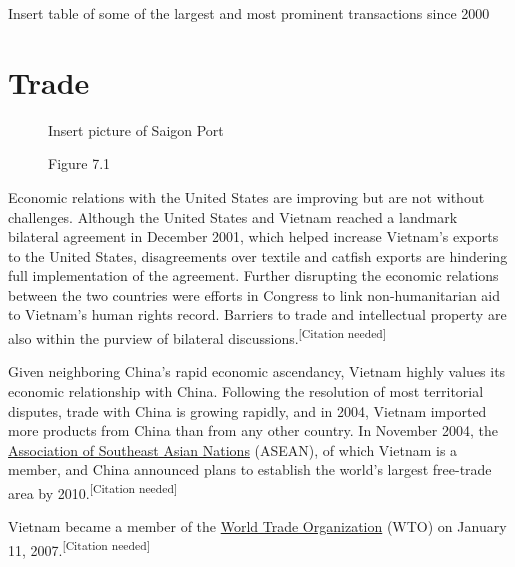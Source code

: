 \documentclass[openany]{book}
\begin{document}
\begin{table}[h]
    \centering
    Insert table of some of the largest and most prominent transactions since 2000
\end{table}

\chapter{Trade}

\begin{figure}
    \begin{framed}
    Insert picture of Saigon Port
    \caption*{\href{https://en.wikipedia.org/wiki/Saigon_Port}{Saigon Port} is the \href{https://en.wikipedia.org/wiki/List_of_busiest_container_ports}{busiest container port} in Vietnam. It is capable of accommodating \href{https://en.wikipedia.org/wiki/Panamax}{post-Panamax} ships.}
    \caption*{Figure 7.1}
    \end{framed}
\end{figure}

Economic relations with the United States are improving but are not without challenges. Although the United States and Vietnam reached a landmark bilateral agreement in December 2001, which helped increase Vietnam's exports to the United States, disagreements over textile and catfish exports are hindering full implementation of the agreement. Further disrupting the economic relations between the two countries were efforts in Congress to link non-humanitarian aid to Vietnam's human rights record. Barriers to trade and intellectual property are also within the purview of bilateral discussions.\textsuperscript{[Citation needed]}

Given neighboring China's rapid economic ascendancy, Vietnam highly values its economic relationship with China. Following the resolution of most territorial disputes, trade with China is growing rapidly, and in 2004, Vietnam imported more products from China than from any other country. In November 2004, the \href{https://en.wikipedia.org/wiki/Association_of_Southeast_Asian_Nations}{Association of Southeast Asian Nations} (ASEAN), of which Vietnam is a member, and China announced plans to establish the world's largest free-trade area by 2010.\textsuperscript{[Citation needed]}

Vietnam became a member of the \href{https://en.wikipedia.org/wiki/World_Trade_Organization}{World Trade Organization} (WTO) on January 11, 2007.\textsuperscript{[Citation needed]}
\end{document}
